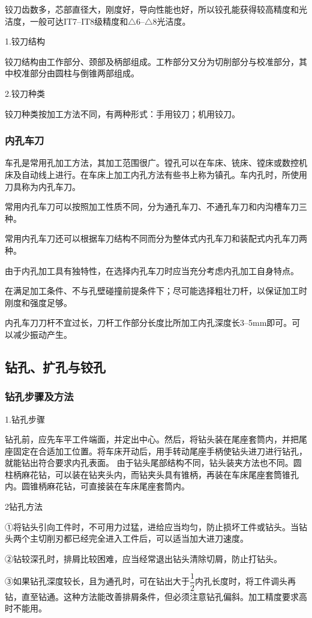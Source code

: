 \documentclass{ctexbook}
\begin{document}
铰刀齿数多，芯部直径大，刚度好，导向性能也好，所以铰孔能获得较高精度和光洁度，一般可达IT7--IT8级精度和$\bigtriangleup$6--$\bigtriangleup$8光洁度。

1.铰刀结构

铰刀结构由工作部分、颈部及柄部组成。工柞部分又分为切削部分与校准部分，其中校准部分由圆柱与倒锥两部组成。

2.铰刀种类

铰刀种类按加工方法不同，有两种形式：手用铰刀；机用铰刀。
\subsubsection{内孔车刀}
车孔是常用孔加工方法，其加工范围很广。镗孔可以在车床、铳床、镗床或数控机床及自动线上进行。在车床上加工内孔方法有些书上称为镇孔。车内孔时，所使用刀具称为内孔车刀。

常用内孔车刀可以按照加工性质不同，分为通孔车刀、不通孔车刀和内沟槽车刀三种。

常用内孔车刀还可以根据车刀结构不同而分为整体式内孔车刀和装配式内孔车刀两种。

由于内孔加工具有独特性，在选择内孔车刀时应当充分考虑内孔加工自身特点。

在满足加工条件、不与孔壁碰撞前提条件下；尽可能选择粗壮刀杆，以保证加工时刚度和强度足够。

内孔车刀刀杆不宜过长，刀杆工作部分长度比所加工内孔深度长3--5mm即可。可以减少振动产生。
\subsection{钻孔、扩孔与铰孔}
\subsubsection{钻孔步骤及方法}
1.钻孔步骤

钻孔前，应先车平工件端面，并定出中心。然后，将钻头装在尾座套筒内，并把尾座固定在合适加工位置。将车床开动后，用手转动尾座手柄使钻头进刀进行钻孔，就能钻出符合要求内孔表面。
由于钻头尾部结构不同，钻头装夹方法也不同。圆柱柄麻花钻，可以装在钻夹头内，而钻夹头具有锥柄，再装在车床尾座套筒锥孔内。圆锥柄麻花钻，可直接装在车床尾座套筒内。

2钻孔方法

①将钻头引向工件时，不可用力过猛，进给应当均匀，防止损坏工件或钻头。当钻头两个主切削刃都已经完全进入工件后，可以适当加大进刀速度。

②钻较深孔时，排屑比较困难，应当经常退出钻头清除切屑，防止打钻头。

③如果钻孔深度较长，且为通孔时，可在钻出大于$\dfrac{1}{2}$内孔长度时，将工件调头再钻，直至钻通。这种方法能改善排屑条件，但必须注意钻孔偏斜。加工精度要求高时不能用。
\end{document}

